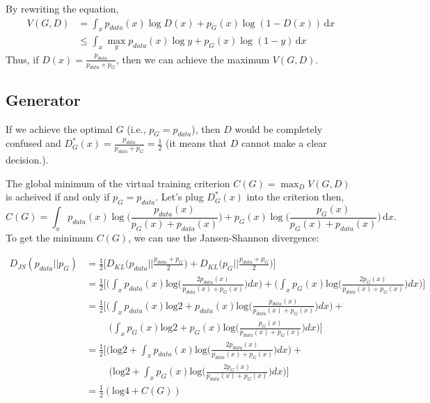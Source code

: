 By rewriting the equation,
\begin{align*}
V(G,D) &= \int_{x} p_{data}(x)\log D(x) + p_G(x) \log ( 1- D(x)) \, \mathrm{d}x \\
& \leq \int_x \max_y {p_{data}(x)\log y + p_G(x) \log ( 1- y)}\, \mathrm{d}x 
\end{align*}
Thus, if $D(x) = \frac{p_{data}}{p_{data}+p_G}$, then we can achieve the maximum $V(G,D)$. 

\subsection{Generator}
If we achieve the optimal $G$ (i.e., $p_G = p_{data}$), then $D$ would be completely confused and $D^*_G(x) = \frac{p_{data}}{p_{data}+p_G}=\frac{1}{2}$ (it means that $D$ cannot make a clear decision.).

The global minimum of the virtual training criterion $C(G)=\max_DV(G,D)$ is acheived if and only if $p_{G}=p_{data}$. Let's plug $D^*_G(x)$ into the criterion then, 
\begin{equation*}
	C(G) = \int_{x} p_{data}(x)\log \big (\frac{p_{data}(x)}{p_{G}(x)+p_{data}(x)} \big )  + p_G(x) \log\big ( \frac{p_{G}(x)}{p_{G}(x)+p_{data}(x)}\big ) \, \mathrm{d}x. 
\end{equation*}
To get the minimum $C(G)$, we can use the Jansen-Shannon divergence:

\begin{align*}
	D_{JS}(p_{data}||p_{G}) & = \frac{1}{2}\Bigg[D_{KL}\Big(p_{data}\Big|\Big|\frac{p_{data}+p_{G}}{2}\Big)+D_{KL}\Big(p_{G}\Big|\Big|\frac{p_{data}+p_{G}}{2}\Big)\Bigg]\\
	& = \frac{1}{2}\Bigg[\Bigg(\int_x p_{data}(x)\textrm{log}\Bigg(\frac{2p_{data}(x)}{p_{data}(x)+p_{G}(x)}\Bigg)dx\Bigg)+\Bigg(\int_x p_{G}(x)\textrm{log}\Bigg(\frac{2p_{G}(x)}{p_{data}(x)+p_{G}(x)}\Bigg)dx\Bigg)\Bigg]\\
	& = \frac{1}{2}\Bigg[\Bigg(\int_x p_{data}(x)\textrm{log}2+p_{data}(x)\textrm{log}\Bigg(\frac{p_{data}(x)}{p_{data}(x)+p_{G}(x)}\Bigg)dx\Bigg)+\\
	&\hspace{1cm}\Bigg(\int_x p_{G}(x)\textrm{log}2+p_{G}(x)\textrm{log}\Bigg(\frac{p_{G}(x)}{p_{data}(x)+p_{G}(x)}\Bigg)dx\Bigg)\Bigg]\\
	& = \frac{1}{2}\Bigg[\Bigg(\textrm{log}2+\int_x p_{data}(x)\textrm{log}\Bigg(\frac{2p_{data}(x)}{p_{data}(x)+p_{G}(x)}\Bigg)dx\Bigg)+\\
	& \hspace{1cm}\Bigg(\textrm{log}2+\int_x p_{G}(x)\textrm{log}\Bigg(\frac{2p_{G}(x)}{p_{data}(x)+p_{G}(x)}\Bigg)dx\Bigg)\Bigg]\\
	& = \frac{1}{2}(\textrm{log}4+C(G))
\end{align*}

